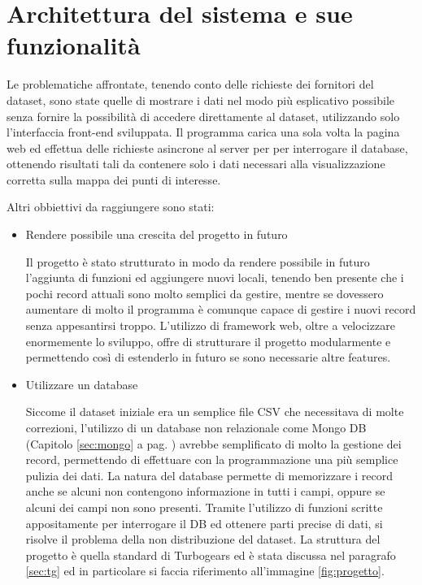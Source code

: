 \chapter{Architettura del sistema e sue funzionalità}%
Le problematiche affrontate, tenendo conto delle richieste dei fornitori del dataset, sono state quelle di mostrare i dati nel modo più esplicativo possibile senza fornire la possibilità di accedere direttamente al dataset, utilizzando solo l'interfaccia front-end sviluppata. Il programma carica una sola volta la pagina web ed effettua delle richieste asincrone al server per per interrogare il database, ottenendo risultati tali da contenere solo i dati necessari alla visualizzazione corretta sulla mappa dei punti di interesse.

Altri obbiettivi da raggiungere sono stati:
\begin{itemize}
	\item Rendere possibile una crescita del progetto in futuro

Il progetto è stato strutturato in modo da rendere possibile in futuro l'aggiunta di funzioni ed aggiungere nuovi locali, tenendo ben presente che i pochi record attuali sono molto semplici da gestire, mentre se dovessero aumentare di molto il programma è comunque capace di gestire i nuovi record senza appesantirsi troppo. L'utilizzo di framework web, oltre a velocizzare enormemente lo sviluppo, offre di strutturare il progetto modularmente e permettendo così di estenderlo in futuro se sono necessarie altre features.

	\item Utilizzare un database

Siccome il dataset iniziale era un semplice file CSV che necessitava di molte correzioni, l'utilizzo di un database non relazionale come Mongo DB (Capitolo \ref{sec:mongo} a pag. \pageref{sec:mongo} ) avrebbe semplificato di molto la gestione dei record, permettendo di effettuare con la programmazione una più semplice pulizia dei dati. La natura del database permette di memorizzare i record anche se alcuni non contengono informazione in tutti i campi, oppure se alcuni dei campi non sono presenti. Tramite l'utilizzo di funzioni scritte appositamente per interrogare il DB ed ottenere parti precise di dati, si risolve il problema della non distribuzione del dataset.
La struttura del progetto è quella standard di Turbogears ed è stata discussa nel paragrafo \ref{sec:tg} ed in particolare si faccia riferimento all'immagine \ref{fig:progetto}.

\end{itemize}

